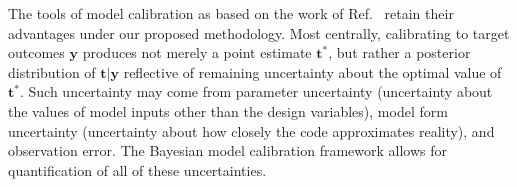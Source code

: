 \documentclass[twocolumn,10pt]{asme2ej}
\begin{document}
%
%
%
%
%

The tools of model calibration as based on the work of Ref.\ \cite{Kennedy2001} retain their advantages under our proposed methodology.
%
Most centrally, calibrating to target outcomes $\mathbf y$ produces not merely a point estimate $\mathbf t^*$, but rather a posterior distribution of $\mathbf t|\mathbf y$ reflective of remaining uncertainty about the optimal value of $\mathbf t^*$. 
%
Such uncertainty may come from parameter uncertainty (uncertainty about the values of model inputs other than the design variables), model form uncertainty (uncertainty about how closely the code approximates reality), and observation error. 
%
%
%
The Bayesian model calibration framework allows for quantification of all of these uncertainties. 
%
\end{document}
